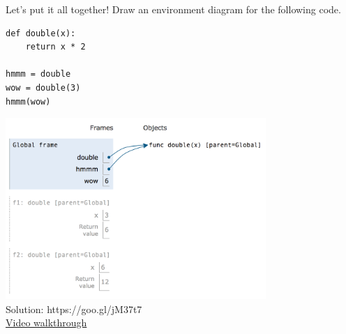 \question Let's put it all together! Draw an environment diagram for the
following code.

\begin{lstlisting}
def double(x):
    return x * 2

hmmm = double
wow = double(3)
hmmm(wow)
\end{lstlisting}

\begin{solution}
\includegraphics[width=280pt]{call-expressions.png} \\
Solution: https://goo.gl/jM37t7 \\
\href{https://youtu.be/rhXyTx-NkfE?t=6m10s}{Video walkthrough}
\end{solution}
